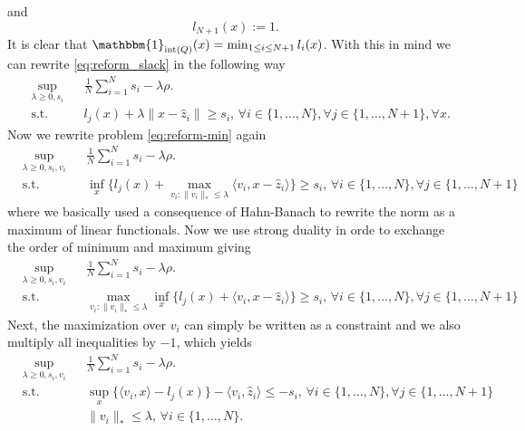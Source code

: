 \documentclass{scrartcl}
\DeclareMathOperator*{\interior}{int}
\begin{document}
and
\begin{equation*}
  l_{N+1}(x) := 1.
\end{equation*}
It is clear that $\mathbbm{1}_{\interior(Q)}(x) = \min_{1\le i \le N+1} l_i(x)$.
With this in mind we can rewrite \eqref{eq:reform_slack} in the following way
\begin{equation}
  \label{eq:reform-min}
  \begin{aligned}
    & \sup_{\lambda \ge 0, s_i} & & \frac{1}{N} \sum_{i=1}^N s_i - \lambda\rho. \\
    & \text{s.t.} & & l_j(x) + \lambda \lVert x-\hat{z}_i \rVert \geq s_i, \, \forall i \in \{1,\dots,N\}, \forall j \in \{1,\dots,N+1\}, \forall x.
  \end{aligned}
\end{equation}
Now we rewrite problem \eqref{eq:reform-min} again 
\begin{equation*}
  \begin{aligned}
    & \sup_{\lambda \ge 0, s_i, v_i} & & \frac{1}{N} \sum_{i=1}^N s_i - \lambda\rho. \\
    & \text{s.t.} & & \inf_x \{l_j(x) + \max_{v_i:\lVert {v_i} \rVert_*\le\lambda}\langle v_i, x-\hat{z}_i \rangle \} \geq s_i, \, \forall i \in \{1,\dots,N\}, \forall j \in \{1,\dots,N+1\}
  \end{aligned}
\end{equation*}
where we basically used a consequence of Hahn-Banach to rewrite the norm as a
maximum of linear functionals. Now we use strong duality in orde to exchange the
order of minimum and maximum giving
\begin{equation*}
  \begin{aligned}
    & \sup_{\lambda \ge 0, s_i,v_i} & & \frac{1}{N} \sum_{i=1}^N s_i - \lambda\rho. \\
    & \text{s.t.} & & \max_{v_i:\lVert {v_i} \rVert_*\le\lambda}\inf_x \{l_j(x) + \langle v_i, x-\hat{z}_i \rangle \} \geq s_i, \, \forall i \in \{1,\dots,N\}, \forall j \in \{1,\dots,N+1\}
  \end{aligned}
\end{equation*}
Next, the maximization over $v_i$ can simply be written as a constraint and we
also multiply all inequalities by $-1$, which yields
\begin{equation*}
  \begin{aligned}
    & \sup_{\lambda \ge 0, s_i,v_i} & & \frac{1}{N} \sum_{i=1}^N s_i - \lambda\rho. \\
    & \text{s.t.} & & \sup_x \{ \langle v_i, x \rangle - l_j(x) \} - \langle {v_i, \hat{z}_i} \rangle \le - s_i, \, \forall i \in \{1,\dots,N\}, \forall j \in \{1,\dots,N+1\} \\
    & & & \lVert {v_i} \rVert_*\le\lambda, \, \forall i \in \{1,\dots,N\}.
  \end{aligned}
\end{equation*}
\end{document}
